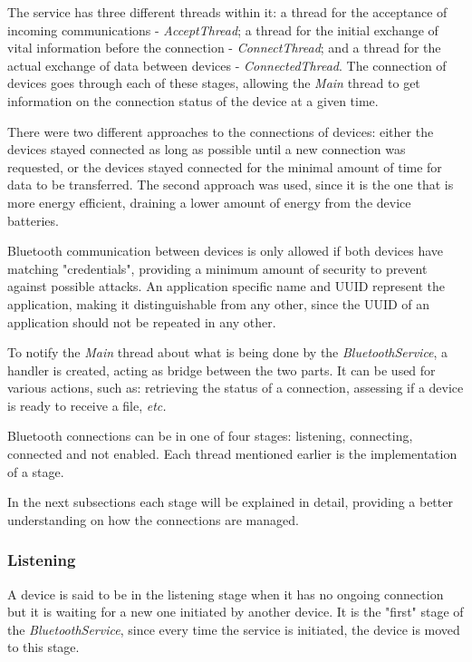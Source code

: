 The service has three different threads within it: a thread for the acceptance of incoming communications - \textit{AcceptThread}; a thread for the initial exchange of vital information before the connection - \textit{ConnectThread}; and a thread for the actual exchange of data between devices - \textit{ConnectedThread}. The connection of devices goes through each of these stages, allowing the \textit{Main} thread to get information on the connection status of the device at a given time.

There were two different approaches to the connections of devices: either the devices stayed connected as long as possible until a new connection was requested, or the devices stayed connected for the minimal amount of time for data to be transferred. The second approach was used, since it is the one that is more energy efficient, draining a lower amount of energy from the device batteries.

Bluetooth communication between devices is only allowed if both devices have matching "credentials", providing a minimum amount of security to prevent against possible attacks. An application specific name and \gls{UUID} represent the application, making it distinguishable from any other, since the \gls{UUID} of an application should not be repeated in any other.

To notify the \textit{Main} thread about what is being done by the \textit{BluetoothService}, a handler is created, acting as bridge between the two parts. It can be used for various actions, such as: retrieving the status of a connection, assessing if a device is ready to receive a file, \textit{etc.}

Bluetooth connections can be in one of four stages: listening, connecting, connected and not enabled. Each thread mentioned earlier is the implementation of a stage.

In the next subsections each stage will be explained in detail, providing a better understanding on how the connections are managed.

\subsubsection{Listening}
\label{subsubsec:listening}

A device is said to be in the listening stage when it has no ongoing connection but it is waiting for a new one initiated by another device. It is the "first" stage of the \textit{BluetoothService}, since every time the service is initiated, the device is moved to this stage.

